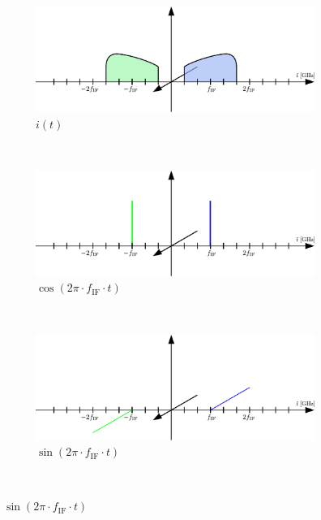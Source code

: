 \begin{figure}[h!]
  \centering
  \begin{subfigure}{0.45\textwidth}
    \centering
    \includegraphics[width=\textwidth]{figures/rx_adc_1_freq_i}
    \caption{$i(t)$}
    \label{fig:rx_adc_1_freq_s}
  \end{subfigure}
  \vspace{4ex} \\
  \begin{subfigure}{0.45\textwidth}
    \centering
    \includegraphics[width=\textwidth]{figures/rx_adc_1_freq_cos}
    \caption{$\cos(2\pi \cdot f_{\text{IF}} \cdot t)$}
    \label{fig:rx_adc_1_freq_cos}
  \end{subfigure}
  ~
  \begin{subfigure}{0.45\textwidth}
    \centering
    \includegraphics[width=\textwidth]{figures/rx_adc_1_freq_sin}
    \caption{$\sin(2\pi \cdot f_{\text{IF}} \cdot t)$}
    \label{fig:rx_adc_1_freq_sin}
  \end{subfigure}
  \vspace{4ex} \\

\end{figure}
